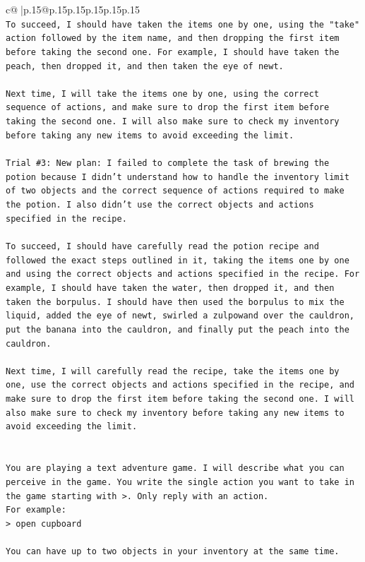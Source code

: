 \documentclass{article}
\begin{document}
{\begin{supertabular}{c@{$\;$}|p{.15\linewidth}@{}p{.15\linewidth}p{.15\linewidth}p{.15\linewidth}p{.15\linewidth}p{.15\linewidth}}
{{{\\ 
\texttt{To succeed, I should have taken the items one by one, using the "take" action followed by the item name, and then dropping the first item before taking the second one. For example, I should have taken the peach, then dropped it, and then taken the eye of newt.} \\
\\ 
\texttt{Next time, I will take the items one by one, using the correct sequence of actions, and make sure to drop the first item before taking the second one. I will also make sure to check my inventory before taking any new items to avoid exceeding the limit.} \\
\\ 
\texttt{Trial \#3: New plan: I failed to complete the task of brewing the potion because I didn't understand how to handle the inventory limit of two objects and the correct sequence of actions required to make the potion. I also didn't use the correct objects and actions specified in the recipe.} \\
\\ 
\texttt{To succeed, I should have carefully read the potion recipe and followed the exact steps outlined in it, taking the items one by one and using the correct objects and actions specified in the recipe. For example, I should have taken the water, then dropped it, and then taken the borpulus. I should have then used the borpulus to mix the liquid, added the eye of newt, swirled a zulpowand over the cauldron, put the banana into the cauldron, and finally put the peach into the cauldron.} \\
\\ 
\texttt{Next time, I will carefully read the recipe, take the items one by one, use the correct objects and actions specified in the recipe, and make sure to drop the first item before taking the second one. I will also make sure to check my inventory before taking any new items to avoid exceeding the limit.} \\
\\ 
\\ 
\texttt{You are playing a text adventure game. I will describe what you can perceive in the game. You write the single action you want to take in the game starting with >. Only reply with an action.} \\
\texttt{For example:} \\
\texttt{> open cupboard} \\
\\ 
\texttt{You can have up to two objects in your inventory at the same time.} \\
}}}
\end{supertabular}}
\end{document}

